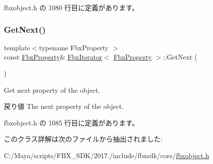 fbxobject.\+h の 1080 行目に定義があります。

\mbox{\label{class_fbx_iterator_a73f4bbaedea5a2f646d2195877eedd17}} 
\subsubsection{\texorpdfstring{Get\+Next()}{GetNext()}}
{\footnotesize\ttfamily template$<$typename Fbx\+Property $>$ \\
const \hyperlink{class_fbx_property}{Fbx\+Property}\& \hyperlink{class_fbx_iterator}{Fbx\+Iterator}$<$ \hyperlink{class_fbx_property}{Fbx\+Property} $>$\+::Get\+Next (\begin{DoxyParamCaption}{ }\end{DoxyParamCaption})\hspace{0.3cm}{\ttfamily [inline]}}

Get next property of the object. \begin{DoxyReturn}{戻り値}
The next property of the object. 
\end{DoxyReturn}


 fbxobject.\+h の 1085 行目に定義があります。



このクラス詳解は次のファイルから抽出されました\+:\begin{DoxyCompactItemize}
\item 
C\+:/\+Maya/scripts/\+F\+B\+X\+\_\+\+S\+D\+K/2017./include/fbxsdk/core/\hyperlink{fbxobject_8h}{fbxobject.\+h}\end{DoxyCompactItemize}
